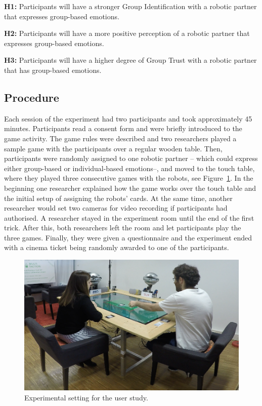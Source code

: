 \textbf{H1:} Participants will have a stronger Group Identification with a robotic partner that expresses group-based emotions.

\textbf{H2:} Participants will have a more positive perception of a robotic partner that expresses group-based emotions.

\textbf{H3:} Participants will have a higher degree of Group Trust with a robotic partner that has group-based emotions.


\subsection{Procedure}
Each session of the experiment had two participants and took approximately 45 minutes. Participants read a consent form and were briefly introduced to the game activity. The game rules were described and two researchers played a sample game with the participants over a regular wooden table. Then, participants were randomly assigned to one robotic partner -- which could express either group-based or individual-based emotions--, and moved to the touch table, where they played three consecutive games with the robots, see Figure~\ref{fig:user-study}.
In the beginning one researcher explained how the game works over the touch table and the initial setup of assigning the robots' cards. At the same time, another researcher would set two cameras for video recording if participants had authorised. A researcher stayed in the experiment room until the end of the first trick. After this, both researchers left the room and let participants play the three games. Finally, they were given a questionnaire and the experiment ended with a cinema ticket being randomly awarded to one of the participants.

\begin{figure}[ht]
    \centering
    \includegraphics[width=0.7\columnwidth]{images/gbe/interaction}
    \caption{Experimental setting for the user study.}
    \label{fig:user-study}
\end{figure}



